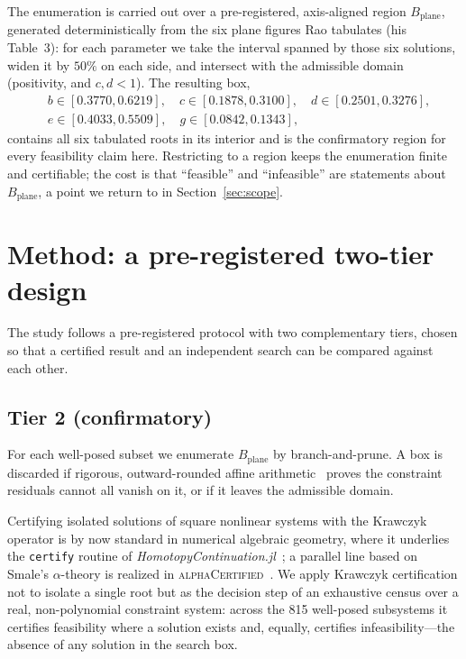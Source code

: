 \documentclass[pdflatex,sn-mathphys-num]{sn-jnl}
\newcommand{\Bplane}{B_{\mathrm{plane}}}
\begin{document}
The enumeration is carried out over a pre-registered, axis-aligned region $\Bplane$, generated deterministically from the six plane figures Rao tabulates (his Table~3): for each parameter we take the interval spanned by those six solutions, widen it by $50\%$ on each side, and intersect with the admissible domain (positivity, and $c,d<1$). The resulting box,
\begin{equation*}
\begin{aligned}
&b\in[0.3770,0.6219],\quad c\in[0.1878,0.3100],\quad d\in[0.2501,0.3276],\\
&e\in[0.4033,0.5509],\quad g\in[0.0842,0.1343],
\end{aligned}
\end{equation*}
contains all six tabulated roots in its interior and is the confirmatory region for every feasibility claim here. Restricting to a region keeps the enumeration finite and certifiable; the cost is that ``feasible'' and ``infeasible'' are statements about $\Bplane$, a point we return to in Section~\ref{sec:scope}.

\section{Method: a pre-registered two-tier design}\label{sec:method}

The study follows a pre-registered protocol with two complementary tiers, chosen so that a certified result and an independent search can be compared against each other.

\subsection*{Tier 2 (confirmatory)}
For each well-posed subset we enumerate $\Bplane$ by branch-and-prune. A box is discarded if rigorous, outward-rounded affine arithmetic~\cite{Stolfi2004} proves the constraint residuals cannot all vanish on it, or if it leaves the admissible domain.

Certifying isolated solutions of square nonlinear systems with the Krawczyk operator is by now standard in numerical algebraic geometry, where it underlies the \texttt{certify} routine of \emph{HomotopyContinuation.jl}~\cite{Breiding2023}; a parallel line based on Smale's $\alpha$-theory is realized in \textsc{alphaCertified}~\cite{HauensteinSottile2012}. We apply Krawczyk certification not to isolate a single root but as the decision step of an exhaustive census over a real, non-polynomial constraint system: across the 815 well-posed subsystems it certifies feasibility where a solution exists and, equally, certifies infeasibility---the absence of any solution in the search box.
\end{document}
